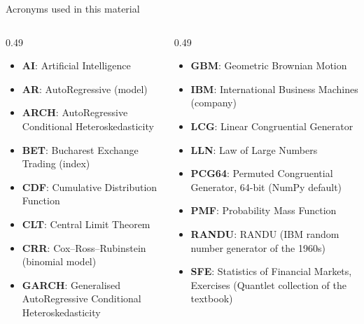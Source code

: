 \begin{frame}{Acronyms used in this material}
\begin{columns}[T]
\begin{column}{0.49\textwidth}
\begin{itemize}\setlength{\itemsep}{0pt}
    \item \textbf{AI}: Artificial Intelligence
    \item \textbf{AR}: AutoRegressive (model)
    \item \textbf{ARCH}: AutoRegressive Conditional Heteroskedasticity
    \item \textbf{BET}: Bucharest Exchange Trading (index)
    \item \textbf{CDF}: Cumulative Distribution Function
    \item \textbf{CLT}: Central Limit Theorem
    \item \textbf{CRR}: Cox–Ross–Rubinstein (binomial model)
    \item \textbf{GARCH}: Generalised AutoRegressive Conditional Heteroskedasticity
\end{itemize}
\end{column}
\begin{column}{0.49\textwidth}
\begin{itemize}\setlength{\itemsep}{0pt}
    \item \textbf{GBM}: Geometric Brownian Motion
    \item \textbf{IBM}: International Business Machines (company)
    \item \textbf{LCG}: Linear Congruential Generator
    \item \textbf{LLN}: Law of Large Numbers
    \item \textbf{PCG64}: Permuted Congruential Generator, 64-bit (NumPy default)
    \item \textbf{PMF}: Probability Mass Function
    \item \textbf{RANDU}: RANDU (IBM random number generator of the 1960s)
    \item \textbf{SFE}: Statistics of Financial Markets, Exercises (Quantlet collection of the textbook)
\end{itemize}
\end{column}
\end{columns}
\end{frame}

